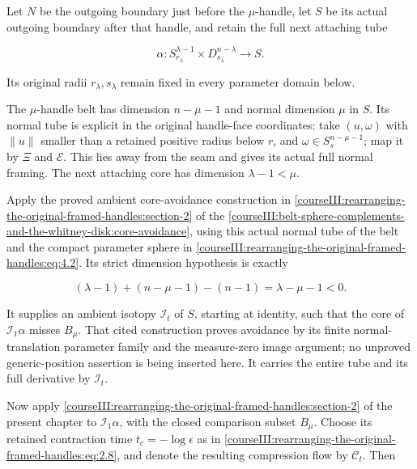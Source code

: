 Let \(N\) be the outgoing boundary just before the \(\mu\)-handle, let \(S\) be its actual outgoing boundary after that handle, and retain the full next attaching tube

\begin{equation}
\alpha:S_{r_\lambda}^{\lambda-1}\times
D_{s_\lambda}^{n-\lambda}\longrightarrow S.
\label{courseIII:rearranging-the-original-framed-handles:eq:4.2}
\end{equation}

Its original radii \(r_\lambda,s_\lambda\) remain fixed in every parameter domain below.

The \(\mu\)-handle belt has dimension \(n-\mu-1\) and normal dimension \(\mu\) in \(S\). Its normal tube is explicit in the original handle-face coordinates: take \((u,\omega)\) with \(\|u\|\) smaller than a retained positive radius below \(r\), and \(\omega\in S_s^{n-\mu-1}\); map it by \(\Xi\) and \(\mathcal E\). This lies away from the seam and gives its actual full normal framing. The next attaching core has dimension \(\lambda-1<\mu\).

Apply the proved ambient core-avoidance construction in \cref{courseIII:rearranging-the-original-framed-handles:section-2} of the \cref{courseIII:belt-sphere-complements-and-the-whitney-disk:core-avoidance}, using this actual normal tube of the belt and the compact parameter sphere in \eqref{courseIII:rearranging-the-original-framed-handles:eq:4.2}. Its strict dimension hypothesis is exactly

\begin{equation}
(\lambda-1)+(n-\mu-1)-(n-1)=\lambda-\mu-1<0.
\label{courseIII:rearranging-the-original-framed-handles:eq:4.3}
\end{equation}

It supplies an ambient isotopy \(\mathcal I_t\) of \(S\), starting at identity, such that the core of \(\mathcal I_1\alpha\) misses \(B_\mu\). That cited construction proves avoidance by its finite normal-translation parameter family and the measure-zero image argument; no unproved generic-position assertion is being inserted here. It carries the entire tube and its full derivative by \(\mathcal I_t\).

Now apply \cref{courseIII:rearranging-the-original-framed-handles:section-2} of the present chapter to \(\mathcal I_1\alpha\), with the closed comparison subset \(B_\mu\). Choose its retained contraction time \(t_c=-\log\epsilon\) as in \eqref{courseIII:rearranging-the-original-framed-handles:eq:2.8}, and denote the resulting compression flow by \(\mathcal C_t\). Then

